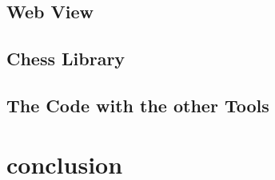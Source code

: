\documentclass[12pt]{report}
\begin{document}
	\section{Web View}
	\section{Chess Library}
	\section{The Code with the other Tools}
\chapter{conclusion}
\end{document}
